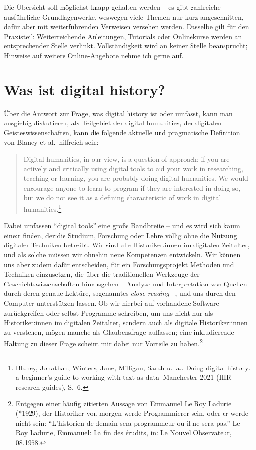 \documentclass[
  letterpaper,
]{book}
\begin{document}
Die Übersicht soll möglichst knapp gehalten werden -- es gibt zahlreiche
ausführliche Grundlagenwerke, weswegen viele Themen nur kurz
angeschnitten, dafür aber mit weiterführenden Verweisen versehen werden.
Dasselbe gilt für den Praxisteil: Weiterreichende Anleitungen, Tutorials
oder Onlinekurse werden an entsprechender Stelle verlinkt.
Vollständigkeit wird an keiner Stelle beansprucht; Hinweise auf weitere
Online-Angebote nehme ich gerne auf.


\hypertarget{was-ist-digital-history}{%
\chapter{Was ist digital history?}\label{was-ist-digital-history}}

Über die Antwort zur Frage, was digital history ist oder umfasst, kann
man ausgiebig diskutieren; als Teilgebiet der digital humanities, der
digitalen Geisteswissenschaften, kann die folgende aktuelle und
pragmatische Definition von Blaney et al.~hilfreich sein:

\begin{quote}
Digital humanities, in our view, is a question of approach: if you are
actively and critically using digital tools to aid your work in
researching, teaching or learning, you are probably doing digital
humanities. We would encourage anyone to learn to program if they are
interested in doing so, but we do not see it as a defining
characteristic of work in digital humanities.\footnote{Blaney, Jonathan;
  Winters, Jane; Milligan, Sarah u.~a.: Doing digital history: a
  beginner's guide to working with text as data, Manchester 2021 ({IHR}
  research guides), S.~6.}
\end{quote}

Dabei umfassen ``digital tools'' eine große Bandbreite -- und es wird
sich kaum eine:r finden, der:die Studium, Forschung oder Lehre völlig
ohne die Nutzung digitaler Techniken betreibt. Wir sind alle
Historiker:innen im digitalen Zeitalter, und als solche müssen wir
ohnehin neue Kompetenzen entwickeln. Wir können uns aber zudem dafür
entscheiden, für ein Forschungsprojekt Methoden und Techniken
einzusetzen, die über die traditionellen Werkzeuge der
Geschichtswissenschaften hinausgehen -- Analyse und Interpretation von
Quellen durch deren genaue Lektüre, sogenanntes \emph{close reading} --,
und uns durch den Computer unterstützen lassen. Ob wir hierbei auf
vorhandene Software zurückgreifen oder selbst Programme schreiben, um
uns nicht nur als Historiker:innen im digitalen Zeitalter, sondern auch
als digitale Historiker:innen zu verstehen, mögen manche als
Glaubensfrage auffassen; eine inkludierende Haltung zu dieser Frage
scheint mir dabei nur Vorteile zu haben.\footnote{Entgegen einer häufig
  zitierten Aussage von Emmanuel Le Roy Ladurie (*1929), der Historiker
  von morgen werde Programmierer sein, oder er werde nicht sein:
  ``L'historien de demain sera programmeur ou il ne sera pas.'' Le Roy
  Ladurie, Emmanuel: La fin des {é}rudits, in: Le Nouvel Observateur,
  08.1968.}
\end{document}
